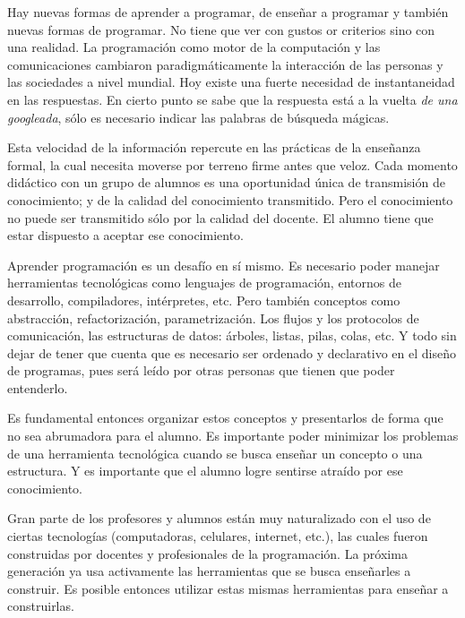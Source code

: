 
Hay nuevas formas de aprender a programar, de enseñar a programar
y también nuevas formas de programar. No tiene que ver con gustos or criterios
sino con una realidad. La programación como motor de la computación y
las comunicaciones cambiaron paradigmáticamente la interacción de las
personas y las sociedades a nivel mundial.
Hoy existe una fuerte necesidad de instantaneidad en las respuestas.
En cierto punto se sabe que la respuesta está a la vuelta
\textit{de una googleada}, sólo es necesario indicar las palabras
de búsqueda mágicas.

Esta velocidad de la información repercute en las prácticas de
la enseñanza formal, la cual necesita moverse por terreno firme
antes que veloz. Cada momento didáctico con un grupo de alumnos
es una oportunidad única de transmisión de conocimiento; y de la
calidad del conocimiento transmitido.
Pero el conocimiento no puede ser transmitido sólo por la calidad del docente.
El alumno tiene que estar dispuesto a aceptar ese conocimiento.

Aprender programación es un desafío en sí mismo. Es necesario poder
manejar herramientas tecnológicas como lenguajes de programación,
entornos de desarrollo, compiladores, intérpretes, etc. Pero también
conceptos como abstracción, refactorización, parametrización.
Los flujos y los protocolos de comunicación, las
estructuras de datos: árboles, listas, pilas, colas, etc.
Y todo sin dejar de tener que cuenta que es necesario ser ordenado y declarativo
en el diseño de programas, pues será leído por otras personas que
tienen que poder entenderlo.

Es fundamental entonces organizar estos conceptos y presentarlos
de forma que no sea abrumadora para el alumno. Es importante poder
minimizar los problemas de una herramienta tecnológica cuando
se busca enseñar un concepto o una estructura.
Y es importante que el alumno logre sentirse atraído por ese conocimiento.

Gran parte de los profesores y alumnos están muy naturalizado con el
uso de ciertas tecnologías (computadoras, celulares, internet, etc.),
las cuales fueron construidas por docentes y profesionales de la programación.
La próxima generación ya usa activamente las herramientas que se busca
enseñarles a construir. Es posible entonces utilizar estas mismas herramientas
para enseñar a construirlas.

